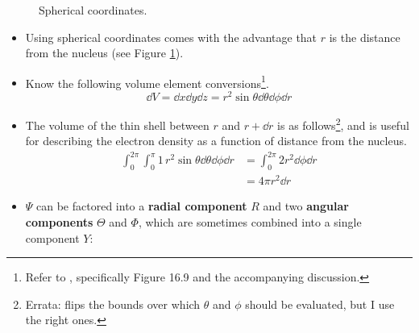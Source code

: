 \documentclass[../main.tex]{subfiles}
\begin{document}
\begin{itemize}
\begin{figure}[h!]
        \caption{Spherical coordinates.}
        \label{fig:sphericalCoords}
    \end{figure}
    \begin{itemize}
        \item Using spherical coordinates comes with the advantage that $r$ is the distance from the nucleus (see Figure \ref{fig:sphericalCoords}).
        \pagebreak
        \item Know the following volume element conversions\footnote{Refer to \textcite{bib:CAAGThomasNotes}, specifically Figure 16.9 and the accompanying discussion.}.
        \begin{equation*}
            \dd{V} = \dd{x}\dd{y}\dd{z}
            = r^2\sin\theta\dd{\theta}\dd{\phi}\dd{r}
        \end{equation*}
        \item The volume of the thin shell between $r$ and $r+\dd{r}$ is as follows\footnote{Errata: \textcite{bib:MiesslerFischerTarr} flips the bounds over which $\theta$ and $\phi$ should be evaluated, but I use the right ones.}, and is useful for describing the electron density as a function of distance from the nucleus.
        \begin{align*}
            \int_0^{2\pi}\int_0^\pi1\, r^2\sin\theta\dd{\theta}\dd{\phi}\dd{r} &= \int_0^{2\pi}2r^2\dd{\phi}\dd{r}\\
            &= 4\pi r^2\dd{r}
        \end{align*}
        \item $\Psi$ can be factored into a \textbf{radial component} $R$ and two \textbf{angular components} $\Theta$ and $\Phi$, which are sometimes combined into a single component $Y$:

\end{itemize}
\end{itemize}
\end{document}
